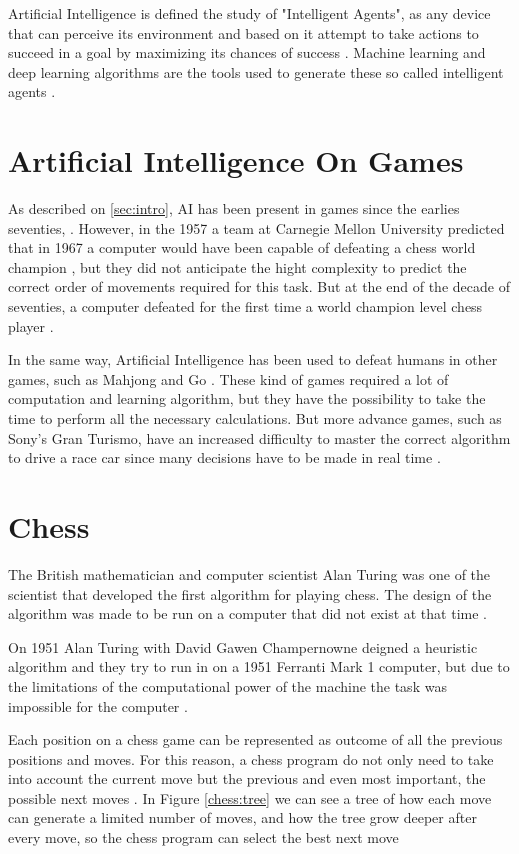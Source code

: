 \documentclass[conference]{IEEEtran}
\begin{document}
Artificial Intelligence is defined the study of "Intelligent Agents", as any device that can perceive its environment and based on it attempt to take actions to succeed in a goal by maximizing its chances of success \cite{ai}. Machine learning and deep learning algorithms are the tools used to generate these so called intelligent agents \cite{ai}.


\section{Artificial Intelligence On Games}

As described on \ref{sec:intro}, AI has been present in games since the earlies seventies, 
\cite{sony}. However, in the 1957  a team at Carnegie Mellon University predicted that in 1967 a computer would have been capable of defeating a chess world champion \cite{euristic}, but they did not anticipate the hight complexity to predict the correct order of movements required for this task. But at the end of the decade of seventies, a computer defeated for the first time a world champion level chess player \cite{bad}.

In the same way, Artificial Intelligence has been used to defeat humans in other games, such as Mahjong and Go \cite{sony}. These kind of games required a lot of computation and learning algorithm, but they have the possibility to take the time to perform all the necessary calculations. But more advance games, such as Sony's Gran Turismo, have an increased difficulty to master the correct algorithm to drive a race car since many decisions have to be made in real time \cite{sony}.

\section{Chess}

The British mathematician and computer scientist Alan Turing was one of the scientist that developed the first algorithm for playing chess. The design of the algorithm was made to be run on a computer that did not exist at that time \cite{how}.

On 1951 Alan Turing with David Gawen Champernowne deigned a heuristic algorithm and they try to run in on a 1951 Ferranti Mark 1 computer, but due to the limitations of the computational power of the machine the task was impossible for the computer \cite{how}.

Each position on a chess game can be represented as outcome of all the previous positions and moves. For this reason, a chess program do not only need to take into account the current move but the previous and even most important, the possible next moves \cite{how}. In Figure \ref{chess:tree} we can see a tree of how each move can generate a limited number of moves, and how the tree grow deeper after every move, so the chess program can select the best next move \cite{how}
\end{document}
